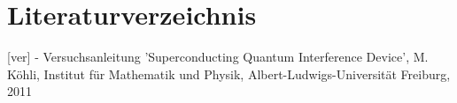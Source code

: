 \clearpage
\section{Literaturverzeichnis}
[ver] - Versuchsanleitung 'Superconducting Quantum Interference Device', M. Köhli, Institut für Mathematik und Physik, Albert-Ludwigs-Universität Freiburg, 2011\\

